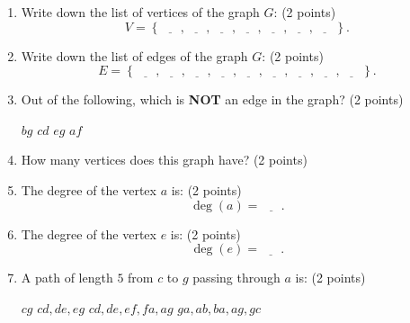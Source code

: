\documentclass[12pt]{exam}
\begin{document}
\begin{enumerate}
\begin{figure}[h!]
\begin{tikzpicture}[x=0.75pt,y=0.75pt,yscale=-1,xscale=1]
    
    \end{tikzpicture}
    

    
\end{figure}

\begin{enumerate}
    \item \label{firstQnSec1} Write down the list of vertices of the graph $G$: (2 points)
    \vspace{0.5em}
    $$V=\left\lbrace\underline{\phantom{ans}},\underline{\phantom{ans}},\underline{\phantom{ans}},\underline{\phantom{ans}},\underline{\phantom{ans}},\underline{\phantom{ans}},\underline{\phantom{ans}}\right\rbrace.$$
    \vfill
    \item Write down the list of edges of the graph $G$: (2 points)
    \vspace{0.5em}
    $$E=\left\lbrace\underline{\phantom{ans}},\underline{\phantom{ans}},\underline{\phantom{ans}},\underline{\phantom{ans}},\underline{\phantom{ans}},\underline{\phantom{ans}},\underline{\phantom{ans}},\underline{\phantom{ans}},\underline{\phantom{ans}}\right\rbrace.$$
    \vfill
    \item Out of the following, which is \textbf{NOT} an edge in the graph? (2 points)
    \begin{checkboxes}
        \choice $bg$
        \choice $cd$
        \choice $eg$
        \choice $af$
    \end{checkboxes}
    \vfill
    \item How many vertices does this graph have? (2 points)
    \begin{checkboxes}
    \end{checkboxes}
    \vfill
    \newpage
    \item The degree of the vertex $a$ is: (2 points)
    \vspace{0.5em}
    $$\deg(a)=\underline{\phantom{ans}}.$$
    \vfill
    \item The degree of the vertex $e$ is: (2 points)
    \vspace{0.5em}
    $$\deg(e)=\underline{\phantom{ans}}.$$
    \vfill
    \item A path of length $5$ from $c$ to $g$ passing through $a$ is: (2 points)
    \begin{checkboxes}
        \choice $cg$
        \choice $cd,de,eg$
        \choice $cd,de,ef,fa,ag$
        \choice $ga,ab,ba,ag,gc$
    \end{checkboxes}

\end{enumerate}
\end{enumerate}
\end{document}
